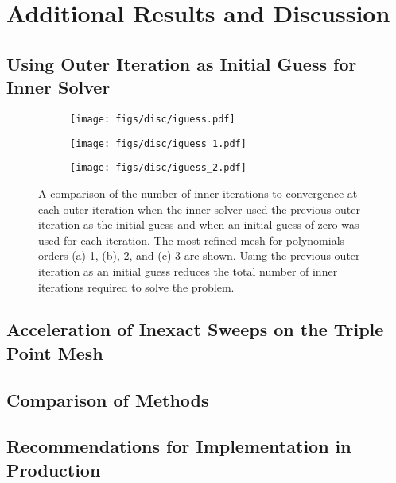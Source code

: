 \documentclass[../doc.tex]{subfiles}
\begin{document}
\chapter{Additional Results and Discussion}
\section{Using Outer Iteration as Initial Guess for Inner Solver}
\begin{figure}
\centering 
\begin{subfigure}{.32\textwidth}
	\centering
	\texttt{[image: figs/disc/iguess.pdf]}
	\caption{}
\end{subfigure}
\begin{subfigure}{.32\textwidth}
	\centering
	\texttt{[image: figs/disc/iguess\_1.pdf]}
	\caption{}
\end{subfigure}
\begin{subfigure}{.32\textwidth}
	\centering
	\texttt{[image: figs/disc/iguess\_2.pdf]}
	\caption{}
\end{subfigure}
\caption{A comparison of the number of inner iterations to convergence at each outer iteration when the inner solver used the previous outer iteration as the initial guess and when an initial guess of zero was used for each iteration. The most refined mesh for polynomials orders (a) 1, (b), 2, and (c) 3 are shown. Using the previous outer iteration as an initial guess reduces the total number of inner iterations required to solve the problem.}
\label{disc:iguess}
\end{figure}

\begin{table}
\centering
\caption{}
\label{}

\end{table}

\section{Acceleration of Inexact Sweeps on the Triple Point Mesh}

\begin{table}
\centering
\caption{}
\label{disc:mult_sweeps}

\end{table}

\begin{table}
\centering
\caption{}
\label{disc:anderson}

\end{table}

\section{Comparison of Methods}

\section{Recommendations for Implementation in Production}
\end{document}
